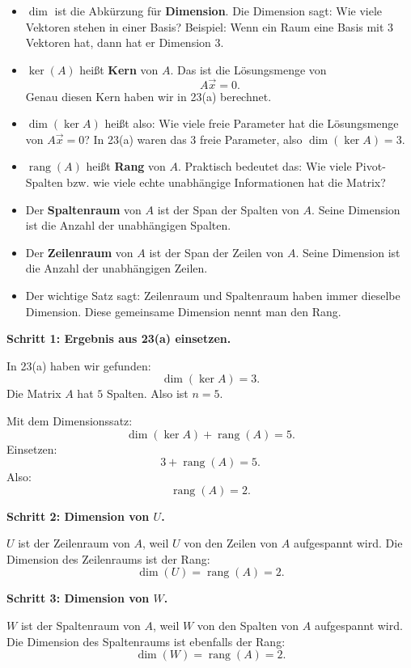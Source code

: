 \documentclass[a4paper,12pt]{article}
\begin{document}
\begin{begriffe}[title={Was bedeuten die Begriffe im Satz?}]
\begin{itemize}[leftmargin=*, nosep]
    \item $\dim$ ist die Abk\"urzung f\"ur \textbf{Dimension}. Die Dimension sagt: Wie viele Vektoren stehen in einer Basis? Beispiel: Wenn ein Raum eine Basis mit $3$ Vektoren hat, dann hat er Dimension $3$.
    \item $\ker(A)$ hei\ss t \textbf{Kern} von $A$. Das ist die L\"osungsmenge von
    \[
    A\vec{x}=0.
    \]
    Genau diesen Kern haben wir in 23(a) berechnet.
    \item $\dim(\ker A)$ hei\ss t also: Wie viele freie Parameter hat die L\"osungsmenge von $A\vec{x}=0$? In 23(a) waren das $3$ freie Parameter, also $\dim(\ker A)=3$.
    \item $\operatorname{rang}(A)$ hei\ss t \textbf{Rang} von $A$. Praktisch bedeutet das: Wie viele Pivot-Spalten bzw. wie viele echte unabh\"angige Informationen hat die Matrix?
    \item Der \textbf{Spaltenraum} von $A$ ist der Span der Spalten von $A$. Seine Dimension ist die Anzahl der unabh\"angigen Spalten.
    \item Der \textbf{Zeilenraum} von $A$ ist der Span der Zeilen von $A$. Seine Dimension ist die Anzahl der unabh\"angigen Zeilen.
    \item Der wichtige Satz sagt: Zeilenraum und Spaltenraum haben immer dieselbe Dimension. Diese gemeinsame Dimension nennt man den Rang.
\end{itemize}
\end{begriffe}

\textbf{Schritt 1: Ergebnis aus 23(a) einsetzen.}

In 23(a) haben wir gefunden:
\[
\dim(\ker A)=3.
\]
Die Matrix $A$ hat $5$ Spalten. Also ist $n=5$.

Mit dem Dimensionssatz:
\[
\dim(\ker A)+\operatorname{rang}(A)=5.
\]
Einsetzen:
\[
3+\operatorname{rang}(A)=5.
\]
Also:
\[
\operatorname{rang}(A)=2.
\]

\textbf{Schritt 2: Dimension von $U$.}

$U$ ist der Zeilenraum von $A$, weil $U$ von den Zeilen von $A$ aufgespannt wird.
Die Dimension des Zeilenraums ist der Rang:
\[
\dim(U)=\operatorname{rang}(A)=2.
\]

\textbf{Schritt 3: Dimension von $W$.}

$W$ ist der Spaltenraum von $A$, weil $W$ von den Spalten von $A$ aufgespannt wird.
Die Dimension des Spaltenraums ist ebenfalls der Rang:
\[
\dim(W)=\operatorname{rang}(A)=2.
\]
\end{document}
